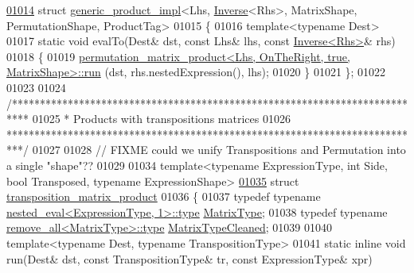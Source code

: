 \begin{DoxyCode}
\hyperlink{struct_eigen_1_1internal_1_1generic__product__impl_3_01_lhs_00_01_inverse_3_01_rhs_01_4_00_01_ma98d6fa405abbfe2d34bd4bd3f95df76a}{01014} \textcolor{keyword}{struct }\hyperlink{struct_eigen_1_1internal_1_1generic__product__impl}{generic\_product\_impl}<Lhs, \hyperlink{class_eigen_1_1_inverse}{Inverse}<Rhs>, MatrixShape, PermutationShape, 
      ProductTag>
01015 \{
01016   \textcolor{keyword}{template}<\textcolor{keyword}{typename} Dest>
01017   \textcolor{keyword}{static} \textcolor{keywordtype}{void} evalTo(Dest& dst, \textcolor{keyword}{const} Lhs& lhs, \textcolor{keyword}{const} \hyperlink{class_eigen_1_1_inverse}{Inverse<Rhs>}& rhs)
01018   \{
01019     \hyperlink{struct_eigen_1_1internal_1_1permutation__matrix__product}{permutation\_matrix\_product<Lhs, OnTheRight, true, MatrixShape>::run}
      (dst, rhs.nestedExpression(), lhs);
01020   \}
01021 \};
01022 
01023 
01024 \textcolor{comment}{/***************************************************************************}
01025 \textcolor{comment}{* Products with transpositions matrices}
01026 \textcolor{comment}{***************************************************************************/}
01027 
01028 \textcolor{comment}{// FIXME could we unify Transpositions and Permutation into a single "shape"??}
01029 
01034 \textcolor{keyword}{template}<\textcolor{keyword}{typename} ExpressionType, \textcolor{keywordtype}{int} S\textcolor{keywordtype}{id}e, \textcolor{keywordtype}{bool} Transposed, \textcolor{keyword}{typename} ExpressionShape>
\hyperlink{struct_eigen_1_1internal_1_1transposition__matrix__product}{01035} \textcolor{keyword}{struct }\hyperlink{struct_eigen_1_1internal_1_1transposition__matrix__product}{transposition\_matrix\_product}
01036 \{
01037   \textcolor{keyword}{typedef} \textcolor{keyword}{typename} \hyperlink{class_eigen_1_1internal_1_1_tensor_lazy_evaluator_writable}{nested\_eval<ExpressionType, 1>::type} 
      \hyperlink{class_eigen_1_1internal_1_1_tensor_lazy_evaluator_writable}{MatrixType};
01038   \textcolor{keyword}{typedef} \textcolor{keyword}{typename} \hyperlink{group___sparse_core___module}{remove\_all<MatrixType>::type} 
      \hyperlink{group___sparse_core___module}{MatrixTypeCleaned};
01039   
01040   \textcolor{keyword}{template}<\textcolor{keyword}{typename} Dest, \textcolor{keyword}{typename} TranspositionType>
01041   \textcolor{keyword}{static} \textcolor{keyword}{inline} \textcolor{keywordtype}{void} run(Dest& dst, \textcolor{keyword}{const} TranspositionType& tr, \textcolor{keyword}{const} ExpressionType& xpr)

\end{DoxyCode}

